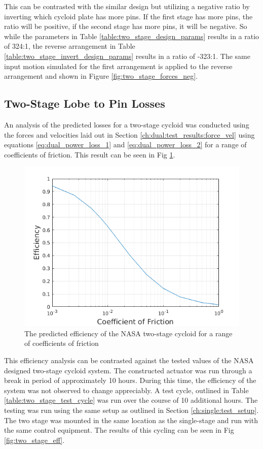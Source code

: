 This can be contrasted with the similar design but utilizing a negative ratio by inverting which cycloid plate has more pins. If the first stage has more pins, the ratio will be positive, if the second stage has more pins, it will be negative. So while the parameters in Table \ref{table:two_stage_design_params} results in a ratio of 324:1, the reverse arrangement in Table \ref{table:two_stage_invert_design_params} results in a ratio of -323:1. The same input motion simulated for the first arrangement is applied to the reverse arrangement and shown in Figure \ref{fig:two_stage_forces_neg}.

\subsection{Two-Stage Lobe to Pin Losses} \label{ch:dual:test_results:losses}

An analysis of the predicted losses for a two-stage cycloid was conducted using the forces and velocities laid out in Section \ref{ch:dual:test_results:force_vel} using equations \ref{eq:dual_power_loss_1} and \ref{eq:dual_power_loss_2} for a range of coefficients of friction. This result can be seen in Fig \ref{fig:two_stage_as_designed}.

\begin{figure}[t]
	\centering
	\includegraphics[width=0.75\linewidth]{fig/two_stage_as_designed}
   \caption{The predicted efficiency of the NASA two-stage cycloid for a range of coefficients of friction}
   \label{fig:two_stage_as_designed}
\end{figure}

This efficiency analysis can be contrasted against the tested values of the NASA designed two-stage cycloid system. The constructed actuator was run through a break in period of approximately 10 hours. During this time, the efficiency of the system was not observed to change appreciably. A test cycle, outlined in Table \ref{table:two_stage_test_cycle} was run over the course of 10 additional hours. The testing was run using the same setup as outlined in Section \ref{ch:single:test_setup}. The two stage was mounted in the same location as the single-stage and run with the same control equipment. The results of this cycling can be seen in Fig \ref{fig:two_stage_eff}.

